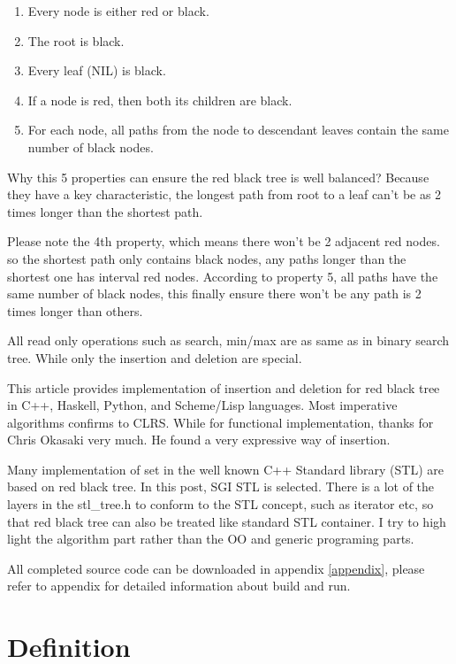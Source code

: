 \documentclass{article}
\begin{document}
\begin{enumerate}
\item Every node is either red or black.
\item The root is black.
\item Every leaf (NIL) is black.
\item If a node is red, then both its children are black.
\item For each node, all paths from the node to descendant leaves contain the same number of black nodes.
\end{enumerate}

Why this 5 properties can ensure the red black tree is well balanced? Because they have a key characteristic, the longest path from root to a leaf can't be as 2 times longer than the shortest path.

Please note the 4th property, which means there won't be 2 adjacent red nodes. so the shortest path only contains black nodes, any paths longer than the shortest one has interval red nodes. According to property 5, all paths have the same number of black nodes, this finally ensure there won't be any path is 2 times longer than others\cite{wiki}.

All read only operations such as search, min/max are as same as in binary search tree. While only the insertion and deletion are special.

This article provides implementation of insertion and deletion for red black tree in C++, Haskell, Python, and Scheme/Lisp languages. Most imperative algorithms confirms to CLRS\cite{CLRS}. While for functional implementation, thanks for Chris Okasaki very much. He found a very expressive way\cite{okasaki} of insertion.

Many implementation of set in the well known C++ Standard library
(STL) are based on red black tree. In this post, SGI STL\cite{sgi-stl} is
selected. There is a lot of the layers in the stl\_tree.h to conform
to the STL concept, such as iterator etc, so that red black tree can
also be treated like standard STL container. I try to high light the
algorithm part rather than the OO and generic programing parts.

All completed source code can be downloaded in appendix \ref{appendix}, please refer to appendix for detailed information about build and run.

\section{Definition}
\label{definition}
\end{document}
